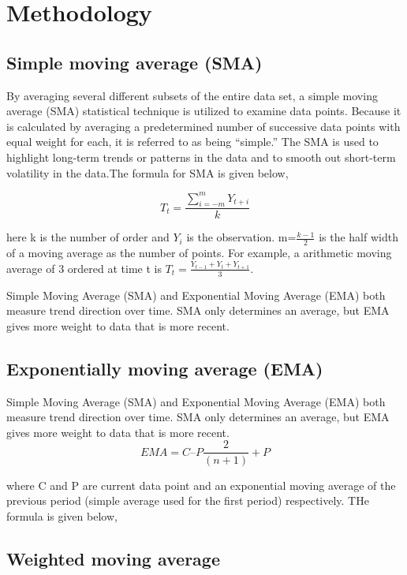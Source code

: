 \documentclass{article}
\begin{document}
\hypertarget{methodology}{%
\section{Methodology}\label{methodology}}

\hypertarget{simple-moving-average-sma}{%
\subsection{Simple moving average
(SMA)}\label{simple-moving-average-sma}}

By averaging several different subsets of the entire data set, a simple
moving average (SMA) statistical technique is utilized to examine data
points. Because it is calculated by averaging a predetermined number of
successive data points with equal weight for each, it is referred to as
being ``simple.'' The SMA is used to highlight long-term trends or
patterns in the data and to smooth out short-term volatility in the
data.The formula for SMA is given below,

\[
{T_t = \frac{\sum_{i=-m}^{m} Y_{t+i}}{k}} 
\]

here k is the number of order and \(Y_i\) is the observation.
m=\(\frac{k-1}{2}\) is the half width of a moving average as the number
of points. For example, a arithmetic moving average of 3 ordered at time
t is \(T_t=\frac{Y_{t-1}+Y_t+Y_{t+1}}{3}\).

Simple Moving Average (SMA) and Exponential Moving Average (EMA) both
measure trend direction over time. SMA only determines an average, but
EMA gives more weight to data that is more recent.

\hypertarget{exponentially-moving-average-ema}{%
\subsection{Exponentially moving average
(EMA)}\label{exponentially-moving-average-ema}}

Simple Moving Average (SMA) and Exponential Moving Average (EMA) both
measure trend direction over time. SMA only determines an average, but
EMA gives more weight to data that is more recent. \[
EMA = C – P \frac{2}{(n+1)} + P
\]

where C and P are current data point and an exponential moving average
of the previous period (simple average used for the first period)
respectively. THe formula is given below,

\hypertarget{weighted-moving-average}{%
\subsection{Weighted moving average}\label{weighted-moving-average}}
\end{document}
